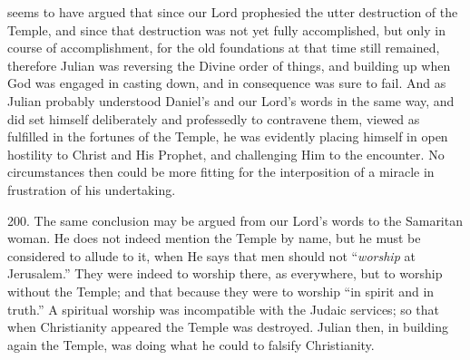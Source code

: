 seems to have argued that since our Lord prophesied the utter
destruction of the Temple, and since that destruction was not yet
fully accomplished, but only in course of accomplishment, for the old
foundations at that time still remained, therefore Julian was
reversing the Divine order of things, and building up when God was
engaged in casting down, and in consequence was sure to fail. And as
Julian probably understood Daniel's and our Lord's words in the same
way, and did set himself deliberately and professedly to contravene
them, viewed as fulfilled in the fortunes of the Temple, he was
evidently placing himself in open hostility to Christ and His Prophet,
and challenging Him to the encounter. No circumstances then could be
more fitting for the interposition of a miracle in frustration of his
undertaking.

200.
The same conclusion may be argued from our Lord's words to the
Samaritan woman. He does not indeed mention the Temple by name, but he
must be considered to allude to it, when He says that men should not ``\emph{worship}
at Jerusalem.'' They were indeed to worship there, as everywhere, but
to worship without the Temple; and that because they were to worship ``in
spirit and in truth.'' A spiritual worship was incompatible with the
Judaic services; so that when Christianity appeared the Temple was
destroyed. Julian then, in building again the Temple, was doing what
he could to falsify Christianity.


